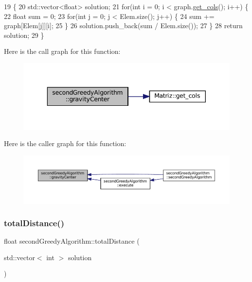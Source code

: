 \begin{DoxyCode}
19                                                                          \{
20   std::vector<float> solution;
21   \textcolor{keywordflow}{for}(\textcolor{keywordtype}{int} i = 0; i < graph.\hyperlink{classMatriz_ad6915f9b31f93230a3ce05d01d23a47b}{get\_cols}(); i++) \{
22     \textcolor{keywordtype}{float} sum = 0;
23     \textcolor{keywordflow}{for}(\textcolor{keywordtype}{int} j = 0; j < Elem.size(); j++) \{      
24       sum += graph[Elem[j]][i]; 
25     \}
26     solution.push\_back(sum / Elem.size());
27   \}
28   \textcolor{keywordflow}{return} solution;
29 \}
\end{DoxyCode}
Here is the call graph for this function\+:
\nopagebreak
\begin{figure}[H]
\begin{center}
\leavevmode
\includegraphics[width=343pt]{classsecondGreedyAlgorithm_a95e094bd3f2ee22127eaaf734c2cee8a_cgraph}
\end{center}
\end{figure}
Here is the caller graph for this function\+:
\nopagebreak
\begin{figure}[H]
\begin{center}
\leavevmode
\includegraphics[width=350pt]{classsecondGreedyAlgorithm_a95e094bd3f2ee22127eaaf734c2cee8a_icgraph}
\end{center}
\end{figure}
\mbox{\label{classsecondGreedyAlgorithm_a21a936acf628b02184e745faf918618a}} 
\subsubsection{\texorpdfstring{total\+Distance()}{totalDistance()}}
{\footnotesize\ttfamily float second\+Greedy\+Algorithm\+::total\+Distance (\begin{DoxyParamCaption}\item[{std\+::vector$<$ int $>$}]{solution }\end{DoxyParamCaption})}



